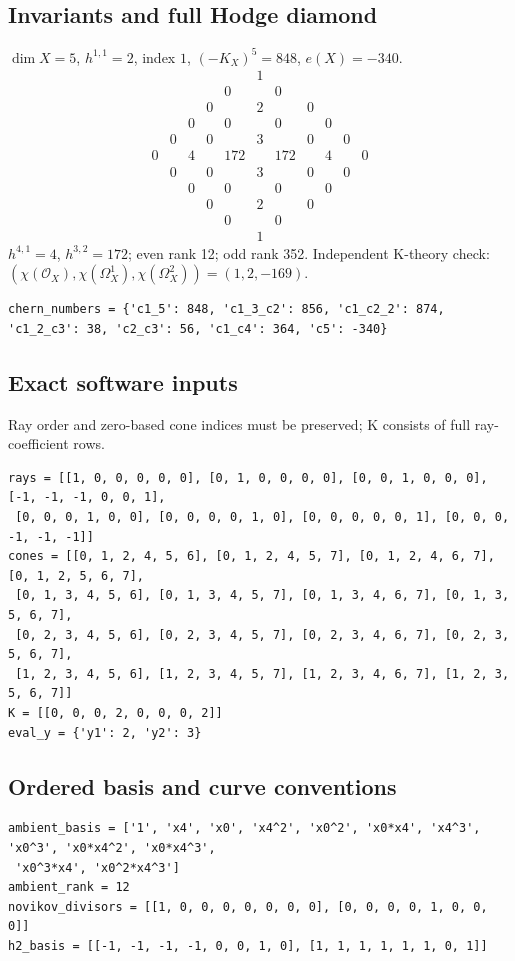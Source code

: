 \documentclass[10pt,a4paper]{article}
\begin{document}
\subsection*{Invariants and full Hodge diamond}
$\dim X=5$, $h^{1,1}=2$, index $1$, $(-K_X)^5=848$, $e(X)=-340$.
\[\begin{array}{ccccccccccc}&&&&&1&&&&&\\&&&&0&&0&&&&\\&&&0&&2&&0&&&\\&&0&&0&&0&&0&&\\&0&&0&&3&&0&&0&\\0&&4&&172&&172&&4&&0\\&0&&0&&3&&0&&0&\\&&0&&0&&0&&0&&\\&&&0&&2&&0&&&\\&&&&0&&0&&&&\\&&&&&1&&&&&\end{array}\]
$h^{4,1}=4$, $h^{3,2}=172$; even rank 12; odd rank 352.
Independent K-theory check: $(\chi(\mathcal O_X),\chi(\Omega_X^1),\chi(\Omega_X^2))=(1, 2, -169)$.
\begin{lstlisting}
chern_numbers = {'c1_5': 848, 'c1_3_c2': 856, 'c1_c2_2': 874, 'c1_2_c3': 38, 'c2_c3': 56, 'c1_c4': 364, 'c5': -340}
\end{lstlisting}
\subsection*{Exact software inputs}
Ray order and zero-based cone indices must be preserved; K consists of full ray-coefficient rows.
\begin{lstlisting}
rays = [[1, 0, 0, 0, 0, 0], [0, 1, 0, 0, 0, 0], [0, 0, 1, 0, 0, 0], [-1, -1, -1, 0, 0, 1],
 [0, 0, 0, 1, 0, 0], [0, 0, 0, 0, 1, 0], [0, 0, 0, 0, 0, 1], [0, 0, 0, -1, -1, -1]]
cones = [[0, 1, 2, 4, 5, 6], [0, 1, 2, 4, 5, 7], [0, 1, 2, 4, 6, 7], [0, 1, 2, 5, 6, 7],
 [0, 1, 3, 4, 5, 6], [0, 1, 3, 4, 5, 7], [0, 1, 3, 4, 6, 7], [0, 1, 3, 5, 6, 7],
 [0, 2, 3, 4, 5, 6], [0, 2, 3, 4, 5, 7], [0, 2, 3, 4, 6, 7], [0, 2, 3, 5, 6, 7],
 [1, 2, 3, 4, 5, 6], [1, 2, 3, 4, 5, 7], [1, 2, 3, 4, 6, 7], [1, 2, 3, 5, 6, 7]]
K = [[0, 0, 0, 2, 0, 0, 0, 2]]
eval_y = {'y1': 2, 'y2': 3}
\end{lstlisting}
\subsection*{Ordered basis and curve conventions}
\begin{lstlisting}
ambient_basis = ['1', 'x4', 'x0', 'x4^2', 'x0^2', 'x0*x4', 'x4^3', 'x0^3', 'x0*x4^2', 'x0*x4^3',
 'x0^3*x4', 'x0^2*x4^3']
ambient_rank = 12
novikov_divisors = [[1, 0, 0, 0, 0, 0, 0, 0], [0, 0, 0, 0, 1, 0, 0, 0]]
h2_basis = [[-1, -1, -1, -1, 0, 0, 1, 0], [1, 1, 1, 1, 1, 1, 0, 1]]
\end{lstlisting}
\end{document}
